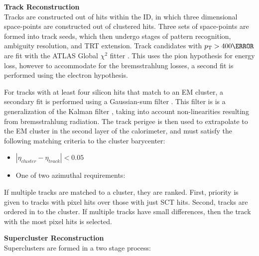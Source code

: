 \noindent\textbf{Track Reconstruction}\\ %
\indent Tracks are constructed out of hits within the \gls{ID}, in which three dimensional space-points are constructed out of clustered hits. Three sets of space-points are formed into track seeds, which then undergo stages of pattern recognition, ambiguity resolution, and \gls{TRT} extension. Track candidates with $\pt > \unit{400}{\MeV}$ are fit with the ATLAS Global $\chi^2$ fitter \cite{chi-2-fitter}. This uses the pion hypothesis for energy loss, however to accommodate for the bremsstrahlung losses, a second fit is performed using the electron hypothesis.

For tracks with at least four silicon hits that match to an \gls{EM} cluster, a secondary fit is performed using a Gaussian-sum filter \cite{gaussian-sum-filter}. This filter is is a generalization of the Kalman filter \cite{kalman-filter}, taking into account non-linearities resulting from bremsstrahlung radiation. The track perigee is then used to extrapolate to the \gls{EM} cluster in the second layer of the calorimeter, and must satisfy the following matching criteria to the cluster barycenter:
\begin{itemize} %
    \item $|\eta_{cluster} - \eta_{track}| < 0.05$
    \item One of two azimuthal requirements:
\end{itemize}

If multiple tracks are matched to a cluster, they are ranked. First, priority is given to tracks with pixel hits over those with just \gls{SCT} hits. Second, tracks are ordered in \Dr to the cluster. If multiple tracks have small \Dr differences, then the track with the most pixel hits is selected. 


\noindent\textbf{Supercluster Reconstruction}\\ 
\indent Superclusters are formed in a two stage process:


